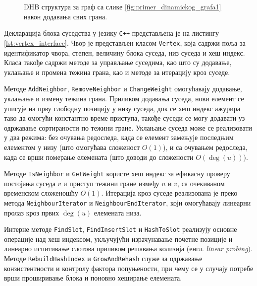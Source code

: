 \begin{figure}[htbp]
\caption{DHB структура за граф са слике \ref{fig:primer_dinamickog_grafa1} након додавања свих грана.}
\label{fig:dhb_sve_grane}
\end{figure}


Декларација блока суседства у језику \texttt{C++} представљена је на листингу \ref{lst:vertex_interface}. Чвор је представљен класом \texttt{Vertex}, која садржи поља за идентификатор чвора, степен, величину блока суседа, низ суседа и хеш индекс. Класа такође садржи методе за управљање суседима, као што су додавање, уклањање и промена тежина грана, као и методе за итерацију кроз суседе.

Методе \texttt{AddNeighbor}, \texttt{RemoveNeighbor} и \texttt{ChangeWeight} омогућавају додавање, уклањање и измену тежина грана. Приликом додавања суседа, нови елемент се уписује на прву слободну позицију у низу суседа, док се хеш индекс ажурира тако да омогући константно време приступа, такође суседи се могу додавати уз одржавање сортираности по тежини гране. Уклањање суседа може се реализовати у два режима: без очувања редоследа, када се елемент замењује последњим елементом у низу (што омогућава сложеност $O(1)$), и са очувањем редоследа, када се врши померање елемената (што доводи до сложености $O(\deg(u))$).

Методе \texttt{IsNeighbor} и \texttt{GetWeight} користе хеш индекс за ефикасну проверу постојања суседа $v$ и приступ тежини гране између $u$ и $v$, са очекиваном временском сложеношћу $O(1)$. Итерација кроз суседе реализована је преко метода \texttt{NeighbourIterator} и \texttt{NeighbourEndIterator}, који омогућавају линеарни пролаз кроз првих $\deg(u)$ елемената низа.

Интерне методе \texttt{Find\allowbreak Slot}, \texttt{Find\allowbreak Insert\allowbreak Slot} и \texttt{Hash\allowbreak To\allowbreak Slot} реализују основне операције над хеш индексом, укључујући израчунавање почетне позиције и линеарно испитивање слотова приликом решавања колизија (енгл. \textit{linear probing}). Методе \texttt{RebuildHash\allowbreak Index} и \texttt{GrowAnd\allowbreak Rehash} служе за одржавање конзистентности и контролу фактора попуњености, при чему се у случају потребе врши проширивање блока и поновно хеширање елемената.

